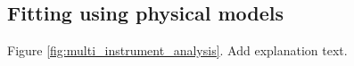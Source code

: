 \subsection{Fitting using physical models}
\label{ssec:naima-analysis}

Figure \ref{fig:multi_instrument_analysis}. Add explanation text.